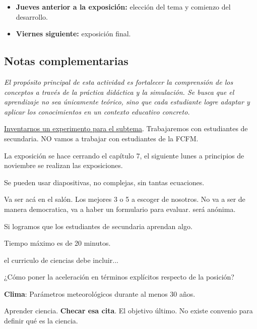 \documentclass{article}
\begin{document}
\begin{itemize}	
  \item \textbf{Jueves anterior a la exposición:} elección del tema y comienzo del desarrollo.
  \item \textbf{Viernes siguiente:} exposición final.
\end{itemize}

\vspace{1em}

\subsection*{Notas complementarias}

\textit{El propósito principal de esta actividad es fortalecer la comprensión de los conceptos a través de la práctica didáctica y la simulación. Se busca que el aprendizaje no sea únicamente teórico, sino que cada estudiante logre adaptar y aplicar los conocimientos en un contexto educativo concreto.}


 
 \underline{Inventarnos un experimento para el subtema}. Trabajaremos con estudiantes de secundaria. NO vamos a trabajar con estudiantes de la FCFM. 
 
 La exposición se hace cerrando el capítulo 7, el siguiente lunes a principios de noviembre se realizan las exposiciones. 
 
 
 Se pueden usar diapositivas, no complejas, sin tantas ecuaciones. 
 
 Va ser acá en el salón. Los mejores 3 o 5 a escoger de nosotros. No va a ser de manera democratica, va a haber un formulario para evaluar. será anónima. 
 
 Si logramos que los estudiantes de secundaria aprendan algo.  
 
 Tiempo máximo es de 20 minutos. 
 
 
 el curriculo de ciencias debe incluir...
 
 ¿Cómo poner la aceleración en términos explícitos respecto de la posición?
 
 \textbf{Clima}: Parámetros meteorológicos durante al menos 30 años. 
 
 Aprender ciencia. \textbf{Checar esa cita}. El objetivo último. No existe convenio para definir qué es la ciencia. 
 
 
\end{document}

